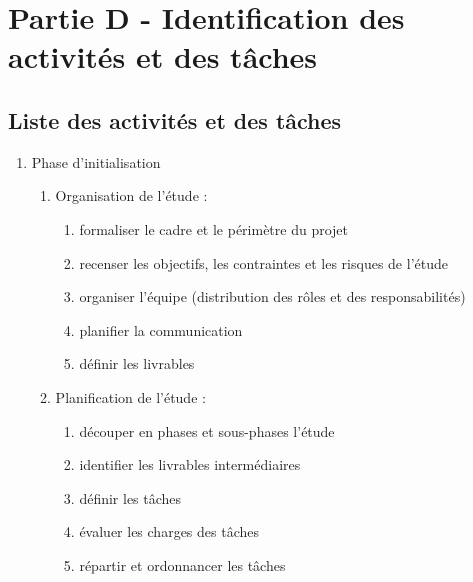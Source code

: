 \chapter*{Partie D - Identification des activités et des tâches}

\section*{Liste des activités et des tâches}


\begin{enumerate}
  \item Phase d'initialisation
          \begin{enumerate}
            \item Organisation de l'étude :
              \begin{enumerate}
                  \item formaliser le cadre et le périmètre du projet 
                  \item  recenser les objectifs, les contraintes et les risques de l'étude 
                  \item  organiser l'équipe (distribution des rôles et des responsabilités) 
                  \item  planifier la communication 
                  \item  définir les livrables 
              \end{enumerate}
            \item Planification de l'étude : 
              \begin{enumerate}
                  \item  découper en phases et sous-phases l'étude 
                  \item  identifier les livrables intermédiaires 
                  \item  définir les tâches 
                  \item  évaluer les charges des tâches 
                  \item  répartir et ordonnancer les tâches 
              \end{enumerate}
          \end{enumerate}


\end{enumerate}
